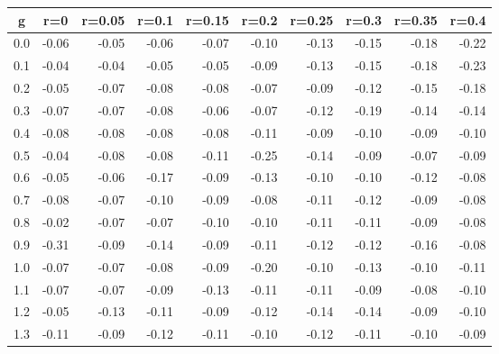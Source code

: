 %
\begin{table}[!tbp]
 \begin{center}
 \begin{tabular}{rrrrrrrrrr}\hline\hline
\multicolumn{1}{c}{g}&\multicolumn{1}{c}{r=0}&\multicolumn{1}{c}{r=0.05}&\multicolumn{1}{c}{r=0.1}&\multicolumn{1}{c}{r=0.15}&\multicolumn{1}{c}{r=0.2}&\multicolumn{1}{c}{r=0.25}&\multicolumn{1}{c}{r=0.3}&\multicolumn{1}{c}{r=0.35}&\multicolumn{1}{c}{r=0.4}\tabularnewline
\hline
0.0&-0.06&-0.05&-0.06&-0.07&-0.10&-0.13&-0.15&-0.18&-0.22\tabularnewline
0.1&-0.04&-0.04&-0.05&-0.05&-0.09&-0.13&-0.15&-0.18&-0.23\tabularnewline
0.2&-0.05&-0.07&-0.08&-0.08&-0.07&-0.09&-0.12&-0.15&-0.18\tabularnewline
0.3&-0.07&-0.07&-0.08&-0.06&-0.07&-0.12&-0.19&-0.14&-0.14\tabularnewline
0.4&-0.08&-0.08&-0.08&-0.08&-0.11&-0.09&-0.10&-0.09&-0.10\tabularnewline
0.5&-0.04&-0.08&-0.08&-0.11&-0.25&-0.14&-0.09&-0.07&-0.09\tabularnewline
0.6&-0.05&-0.06&-0.17&-0.09&-0.13&-0.10&-0.10&-0.12&-0.08\tabularnewline
0.7&-0.08&-0.07&-0.10&-0.09&-0.08&-0.11&-0.12&-0.09&-0.08\tabularnewline
0.8&-0.02&-0.07&-0.07&-0.10&-0.10&-0.11&-0.11&-0.09&-0.08\tabularnewline
0.9&-0.31&-0.09&-0.14&-0.09&-0.11&-0.12&-0.12&-0.16&-0.08\tabularnewline
1.0&-0.07&-0.07&-0.08&-0.09&-0.20&-0.10&-0.13&-0.10&-0.11\tabularnewline
1.1&-0.07&-0.07&-0.09&-0.13&-0.11&-0.11&-0.09&-0.08&-0.10\tabularnewline
1.2&-0.05&-0.13&-0.11&-0.09&-0.12&-0.14&-0.14&-0.09&-0.10\tabularnewline
1.3&-0.11&-0.09&-0.12&-0.11&-0.10&-0.12&-0.11&-0.10&-0.09\tabularnewline
\hline
\end{tabular}

\end{center}

\end{table}

